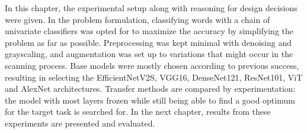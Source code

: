 \documentclass[english,twoside,openright]{UH_DS_MSc}
\begin{document}



In this chapter, the experimental setup along with reasoning for design decisions were given.
In the problem formulation, classifying words with a chain of univariate classifiers was opted for to 
maximize the accuracy by simplifying the problem as far as possible.
Preprocessing was kept minimal with denoising and grayscaling, 
and augmentation was set up to variations that might occur in the scanning process. Base models were mostly
chosen according to previous success, resulting in selecting the EfficientNetV2S, VGG16, DenseNet121, ResNet101, ViT and AlexNet architectures.
Transfer methods are compared by experimentation: the model with most layers frozen while still being able to find a good optimum 
for the target task is searched for. In the next chapter, 
results from these experiments are presented and evaluated.
\end{document}
